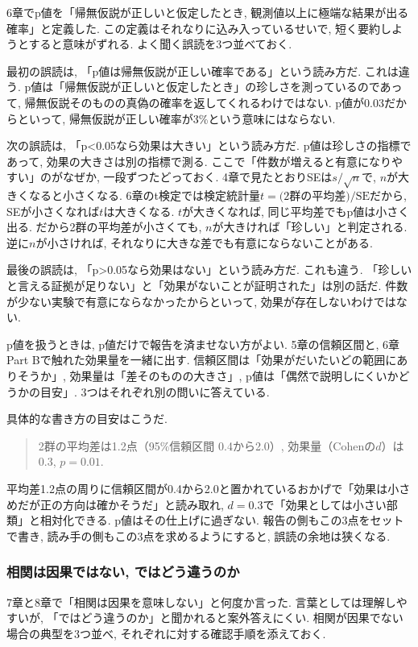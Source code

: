 6章でp値を「帰無仮説が正しいと仮定したとき, 観測値以上に極端な結果が出る確率」と定義した.
この定義はそれなりに込み入っているせいで, 短く要約しようとすると意味がずれる.
よく聞く誤読を3つ並べておく.

最初の誤読は, 「p値は帰無仮説が正しい確率である」という読み方だ.
これは違う. p値は「帰無仮説が正しいと仮定したとき」の珍しさを測っているのであって, 帰無仮説そのものの真偽の確率を返してくれるわけではない.
p値が0.03だからといって, 帰無仮説が正しい確率が3\%という意味にはならない.

次の誤読は, 「p<0.05なら効果は大きい」という読み方だ.
p値は珍しさの指標であって, 効果の大きさは別の指標で測る.
ここで「件数が増えると有意になりやすい」のがなぜか, 一段ずつたどっておく.
4章で見たとおりSEは$s/\sqrt{n}$で, $n$が大きくなると小さくなる.
6章のt検定では検定統計量$t = \text{(2群の平均差)}/\text{SE}$だから, SEが小さくなれば$t$は大きくなる.
$t$が大きくなれば, 同じ平均差でもp値は小さく出る.
だから2群の平均差が小さくても, $n$が大きければ「珍しい」と判定される.
逆に$n$が小さければ, それなりに大きな差でも有意にならないことがある.

最後の誤読は, 「p>0.05なら効果はない」という読み方だ.
これも違う. 「珍しいと言える証拠が足りない」と「効果がないことが証明された」は別の話だ.
件数が少ない実験で有意にならなかったからといって, 効果が存在しないわけではない.

p値を扱うときは, p値だけで報告を済ませない方がよい.
5章の信頼区間と, 6章Part Bで触れた効果量を一緒に出す.
信頼区間は「効果がだいたいどの範囲にありそうか」, 効果量は「差そのものの大きさ」, p値は「偶然で説明しにくいかどうかの目安」.
3つはそれぞれ別の問いに答えている.

具体的な書き方の目安はこうだ.

\begin{quote}
2群の平均差は1.2点（95\%信頼区間 0.4から2.0）, 効果量（Cohenの$d$）は0.3, $p = 0.01$.
\end{quote}

平均差1.2点の周りに信頼区間が0.4から2.0と置かれているおかげで「効果は小さめだが正の方向は確かそうだ」と読み取れ, $d = 0.3$で「効果としては小さい部類」と相対化できる. p値はその仕上げに過ぎない.
報告の側もこの3点をセットで書き, 読み手の側もこの3点を求めるようにすると, 誤読の余地は狭くなる.

\subsubsection*{相関は因果ではない, ではどう違うのか}

7章と8章で「相関は因果を意味しない」と何度か言った.
言葉としては理解しやすいが, 「ではどう違うのか」と聞かれると案外答えにくい.
相関が因果でない場合の典型を3つ並べ, それぞれに対する確認手順を添えておく.

